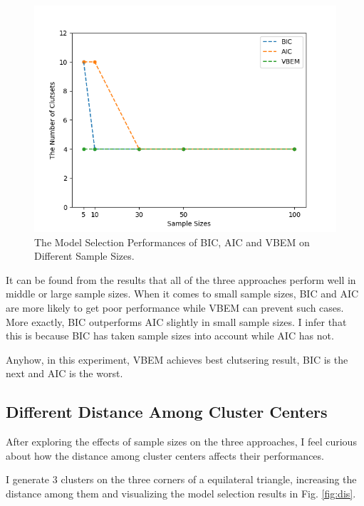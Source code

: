 \documentclass[12pt,a4paper]{article}
\theoremstyle{definition}
\begin{document}
\begin{figure}[H]
	\centering
	\includegraphics[width=0.5\linewidth]{demo/sample_line.png}
	\caption{The Model Selection Performances of BIC, AIC and VBEM on Different Sample Sizes.}
	\label{fig:sample_line}
\end{figure}

It can be found from the results that all of the three approaches perform well in middle or large sample sizes. When it comes to small sample sizes, BIC and AIC are more likely to  get poor performance while VBEM can prevent such cases. More exactly, BIC outperforms AIC slightly in small sample sizes. I infer that this is because BIC has taken sample sizes into account while AIC has not.

Anyhow, in this experiment, VBEM achieves best clutsering result, BIC is the next and AIC is the worst.

\subsection{Different Distance Among Cluster Centers}
\label{sec:2}

After exploring the effects of sample sizes on the three approaches, I feel curious about how the distance among cluster centers affects their performances.

I generate 3 clusters on the three corners of a equilateral triangle, increasing the distance among them and visualizing the model selection results in Fig. \ref{fig:dis}.
\end{document}
